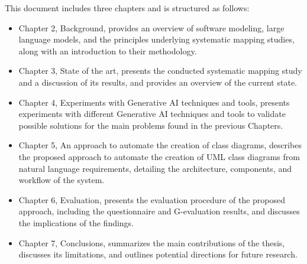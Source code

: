  This document includes three chapters and is structured as follows:
 \begin{itemize}
  \item Chapter 2, Background, provides an overview of software modeling, large language models, and the principles underlying systematic mapping studies, along with an introduction to their methodology.
  \item Chapter 3, State of the art, presents the conducted systematic mapping study and a discussion of its results, and provides an overview of the current state.
  \item Chapter 4, Experiments with Generative AI techniques and tools, presents experiments with different Generative AI techniques and tools to validate possible solutions for the main problems found in the previous Chapters.
  \item Chapter 5,  An approach to automate the creation of class diagrams, describes the proposed approach to automate the creation of UML class diagrams from natural language requirements, detailing the architecture, components, and workflow of the system.
  \item Chapter 6, Evaluation, presents the evaluation procedure of the proposed approach, including the questionnaire and G-evaluation results, and discusses the implications of the findings.
  \item Chapter 7, Conclusions, summarizes the main contributions of the thesis, discusses its limitations, and outlines potential directions for future research.
\end{itemize}
